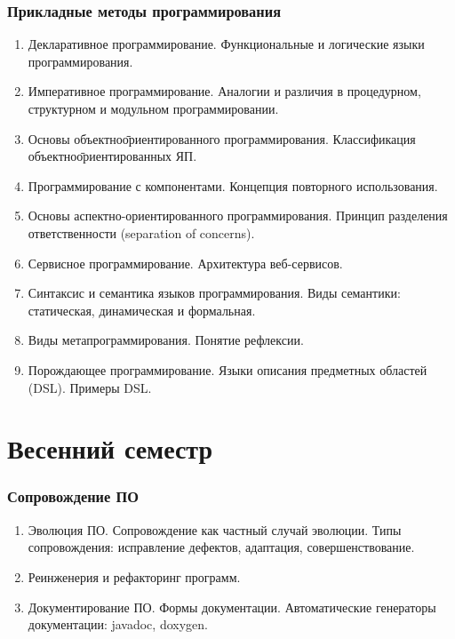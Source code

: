 \documentclass[a4paper,10pt]{article}
\newcounter{globalenum}
\newenvironment{genumerate}{%
	\begin{enumerate}%
	\afterlabel.%
	\setcounter{enumi}{\theglobalenum}%
}{%
	\setcounter{globalenum}{\theenumi}%
	\end{enumerate}%
}
\begin{document}
\subsubsection*{Прикладные методы программирования}

\begin{genumerate}
	\item
	Декларативное программирование. Функциональные и логические языки программирования.

	\item
	Императивное программирование. Аналогии и различия в процедурном, структурном и модульном программировании.

	\item
	Основы объектно\=ориентированного программирования. Классификация объектно\=ориентированных ЯП.

	\item
	Программирование с компонентами. Концепция повторного использования.

	\item
	Основы аспектно-ориентированного программирования. Принцип разделения ответственности (separation of concerns).

	\item
	Сервисное программирование. Архитектура веб-сервисов.

	\item
	Синтаксис и семантика языков программирования. Виды семантики: статическая, динамическая и формальная.

	\item
	Виды метапрограммирования. Понятие рефлексии.

	\item
	Порождающее программирование. Языки описания предметных областей (DSL). Примеры DSL.
\end{genumerate}

\section{Весенний семестр}

\subsubsection*{Сопровождение ПО}

\begin{genumerate}
	\item
	Эволюция ПО. Сопровождение как частный случай эволюции. 
	Типы сопровождения: исправление дефектов, адаптация, совершенствование.

	\item
	Реинженерия и рефакторинг программ.

	\item
	Документирование ПО. Формы документации. 
	Автоматические генераторы документации: javadoc, doxygen.
\end{genumerate}
\end{document}

